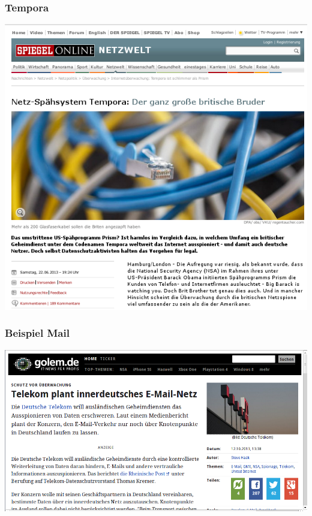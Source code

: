 \documentclass[12pt]{beamer}
\begin{document}
\begin{frame}
    \frametitle{Tempora}
    \includegraphics[height=0.7\textheight]{img/spiegel-tempora.png}
\end{frame}

\begin{frame}
    \frametitle{Beispiel Mail}
    \begin{center}
      \includegraphics[height=0.7\textheight]{img/telekom_mail.png}
    \end{center}	
\end{frame}
\end{document}
